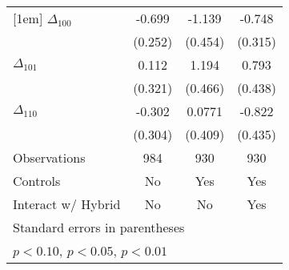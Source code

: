 {\begin{tabular}{l*{3}{c}}
[1em]
$\Delta_{100}$&      -0.699\sym{***}&      -1.139\sym{**} &      -0.748\sym{**} \\
            &     (0.252)         &     (0.454)         &     (0.315)         \\
[1em]
$\Delta_{101}$&       0.112         &       1.194\sym{**} &       0.793\sym{*}  \\
            &     (0.321)         &     (0.466)         &     (0.438)         \\
[1em]
$\Delta_{110}$&      -0.302         &      0.0771         &      -0.822\sym{*}  \\
            &     (0.304)         &     (0.409)         &     (0.435)         \\
\hline
Observations&         984         &         930         &         930         \\
Controls    &          No         &         Yes         &         Yes         \\
Interact w/ Hybrid&          No         &          No         &         Yes         \\
\hline\hline
\multicolumn{4}{l}{\footnotesize Standard errors in parentheses}\\
\multicolumn{4}{l}{\footnotesize \sym{*} \(p<0.10\), \sym{**} \(p<0.05\), \sym{***} \(p<0.01\)}\\
\end{tabular}
}
